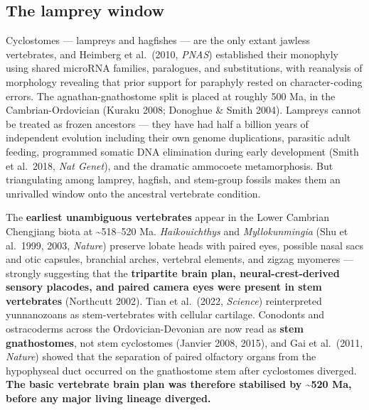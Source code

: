 \subsection{The lamprey window}\label{04_urbilateria-the-lamprey-window}

Cyclostomes --- lampreys and hagfishes --- are the only extant jawless vertebrates, and Heimberg et al.~(2010, \emph{PNAS}) established their monophyly using shared microRNA families, paralogues, and substitutions, with reanalysis of morphology revealing that prior support for paraphyly rested on character-coding errors. The agnathan-gnathostome split is placed at roughly 500 Ma, in the Cambrian-Ordovician (Kuraku 2008; Donoghue \& Smith 2004). Lampreys cannot be treated as frozen ancestors --- they have had half a billion years of independent evolution including their own genome duplications, parasitic adult feeding, programmed somatic DNA elimination during early development (Smith et al.~2018, \emph{Nat Genet}), and the dramatic ammocoete metamorphosis. But triangulating among lamprey, hagfish, and stem-group fossils makes them an unrivalled window onto the ancestral vertebrate condition.

The \textbf{earliest unambiguous vertebrates} appear in the Lower Cambrian Chengjiang biota at \textasciitilde518--520 Ma. \emph{Haikouichthys} and \emph{Myllokunmingia} (Shu et al.~1999, 2003, \emph{Nature}) preserve lobate heads with paired eyes, possible nasal sacs and otic capsules, branchial arches, vertebral elements, and zigzag myomeres --- strongly suggesting that the \textbf{tripartite brain plan, neural-crest-derived sensory placodes, and paired camera eyes were present in stem vertebrates} (Northcutt 2002). Tian et al.~(2022, \emph{Science}) reinterpreted yunnanozoans as stem-vertebrates with cellular cartilage. Conodonts and ostracoderms across the Ordovician-Devonian are now read as \textbf{stem gnathostomes}, not stem cyclostomes (Janvier 2008, 2015), and Gai et al.~(2011, \emph{Nature}) showed that the separation of paired olfactory organs from the hypophyseal duct occurred on the gnathostome stem after cyclostomes diverged. \textbf{The basic vertebrate brain plan was therefore stabilised by \textasciitilde520 Ma, before any major living lineage diverged.}

